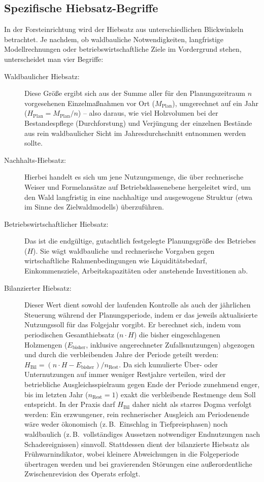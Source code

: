 \documentclass[twocolumn, paper=a4, fontsize=10pt]{scrartcl}
\begin{document}
\subsection{Spezifische Hiebsatz-Begriffe}

In der Forsteinrichtung wird der Hiebsatz aus unterschiedlichen Blickwinkeln betrachtet. Je nachdem, ob waldbauliche Notwendigkeiten, langfristige Modellrechnungen oder betriebswirtschaftliche Ziele im Vordergrund stehen, unterscheidet man vier Begriffe:

\begin{description}
\item[Waldbaulicher Hiebsatz:] Diese Größe ergibt sich aus der Summe aller für den Planungszeitraum $n$ vorgesehenen Einzelmaßnahmen vor Ort ($M_{\text{Plan}}$), umgerechnet auf ein Jahr ($H_{\text{Plan}} = M_{\text{Plan}} / n$) -- also daraus, wie viel Holzvolumen bei der Bestandespflege (Durchforstung) und Verjüngung der einzelnen Bestände aus rein waldbaulicher Sicht im Jahresdurchschnitt entnommen werden sollte.
\item[Nachhalts-Hiebsatz:] Hierbei handelt es sich um jene Nutzungsmenge, die über rechnerische Weiser und Formelansätze auf Betriebsklassenebene hergeleitet wird, um den Wald langfristig in eine nachhaltige und ausgewogene Struktur (etwa im Sinne des Zielwaldmodells) überzuführen.
\item[Betriebswirtschaftlicher Hiebsatz:] Das ist die endgültige, gutachtlich festgelegte Planungsgröße des Betriebes ($H$). Sie wägt waldbauliche und rechnerische Vorgaben gegen wirtschaftliche Rahmenbedingungen wie Liquiditätsbedarf, Einkommensziele, Arbeitskapazitäten oder anstehende Investitionen ab.
\item[Bilanzierter Hiebsatz:] Dieser Wert dient sowohl der laufenden Kontrolle als auch der jährlichen Steuerung während der Planungsperiode, indem er das jeweils aktualisierte Nutzungssoll für das Folgejahr vorgibt. Er berechnet sich, indem vom periodischen Gesamthiebsatz ($n \cdot H$) die bisher eingeschlagenen Holzmengen ($E_{\text{bisher}}$, inklusive angerechneter Zufallsnutzungen) abgezogen und durch die verbleibenden Jahre der Periode geteilt werden: $H_{\text{Bil}} = (n \cdot H - E_{\text{bisher}}) / n_{\text{Rest}}$. Da sich kumulierte Über- oder Unternutzungen auf immer weniger Restjahre verteilen, wird der betriebliche Ausgleichsspielraum gegen Ende der Periode zunehmend enger, bis im letzten Jahr ($n_{\text{Rest}} = 1$) exakt die verbleibende Restmenge dem Soll entspricht. In der Praxis darf $H_{\text{Bil}}$ daher nicht als starres Dogma verfolgt werden: Ein erzwungener, rein rechnerischer Ausgleich am Periodenende wäre weder ökonomisch (z.\,B.\ Einschlag in Tiefpreisphasen) noch waldbaulich (z.\,B.\ vollständiges Aussetzen notwendiger Endnutzungen nach Schadereignissen) sinnvoll. Stattdessen dient der bilanzierte Hiebsatz als Frühwarnindikator, wobei kleinere Abweichungen in die Folgeperiode übertragen werden und bei gravierenden Störungen eine außerordentliche Zwischenrevision des Operats erfolgt.
\end{description}
\end{document}
